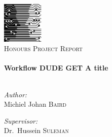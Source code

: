 \begin{titlepage}

\begin{center}


\includegraphics[width=0.15\textwidth]{./images/cslogo}\\[1cm]


\textsc{\Large Honours Project Report}\\[0.5cm]


\HRule \\[0.4cm]
{ \huge \bfseries Workflow DUDE GET A title}\\[0.4cm]

\HRule \\[1.5cm]

\begin{minipage}{0.4\textwidth}
\begin{flushleft} \large
\emph{Author:}\\
Michiel Johan \textsc{Baird}
\end{flushleft}
\end{minipage}
\begin{minipage}{0.4\textwidth}
\begin{flushright} \large
\emph{Supervisor:} \\
Dr.~Hussein \textsc{Suleman}
\end{flushright}
\end{minipage}


\end{center}
\end{titlepage}
